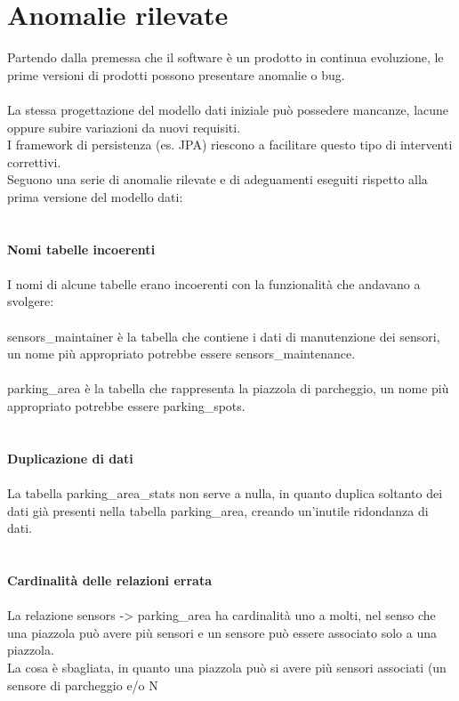 \section{Anomalie rilevate}
Partendo dalla premessa che il software è un prodotto in continua evoluzione, le prime versioni
di prodotti possono presentare anomalie o bug.
\\\\
La stessa progettazione del modello dati iniziale può possedere mancanze, lacune oppure subire variazioni da nuovi requisiti. 
\\
I framework di persistenza (es. JPA) 
riescono a facilitare questo tipo di interventi correttivi.
\\
Seguono una serie di anomalie rilevate e di adeguamenti eseguiti rispetto alla prima versione del modello dati:
\\\\\\
\textbf{Nomi tabelle incoerenti}
\\\\
I nomi di alcune tabelle erano incoerenti con la funzionalità che andavano a svolgere:
\\\\
sensors\_maintainer è la tabella che contiene i dati di manutenzione dei sensori, un 
nome più appropriato potrebbe essere sensors\_maintenance.
\\\\
parking\_area è la tabella che rappresenta la piazzola di parcheggio, un nome più appropriato
potrebbe essere parking\_spots.
\\\\\\
\textbf{Duplicazione di dati}
\\\\
La tabella parking\_area\_stats non serve a nulla, in quanto duplica soltanto dei dati già presenti
nella tabella parking\_area, creando un'inutile ridondanza di dati.
\\\\\\
\textbf{Cardinalità delle relazioni errata}
\\\\
La relazione sensors -> parking\_area ha cardinalità uno a molti, nel senso che una piazzola può avere
più sensori e un sensore può essere associato solo a una piazzola. 
\\
La cosa è sbagliata, in quanto una piazzola può si avere più sensori associati (un sensore di parcheggio e/o N
